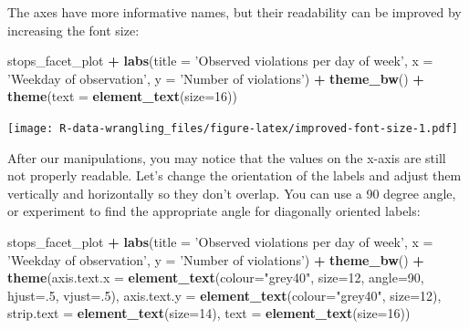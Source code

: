 \documentclass[]{book}
\newenvironment{Shaded}{\begin{snugshade}}{\end{snugshade}}
\newcommand{\DataTypeTok}[1]{\textcolor[rgb]{0.13,0.29,0.53}{#1}}
\newcommand{\DecValTok}[1]{\textcolor[rgb]{0.00,0.00,0.81}{#1}}
\newcommand{\KeywordTok}[1]{\textcolor[rgb]{0.13,0.29,0.53}{\textbf{#1}}}
\newcommand{\NormalTok}[1]{#1}
\newcommand{\OperatorTok}[1]{\textcolor[rgb]{0.81,0.36,0.00}{\textbf{#1}}}
\newcommand{\StringTok}[1]{\textcolor[rgb]{0.31,0.60,0.02}{#1}}
\begin{document}
The axes have more informative names, but their readability can be improved by
increasing the font size:

\begin{Shaded}
\begin{Highlighting}[]
\NormalTok{stops_facet_plot }\OperatorTok{+}
\StringTok{  }\KeywordTok{labs}\NormalTok{(}\DataTypeTok{title =} \StringTok{'Observed violations per day of week'}\NormalTok{,}
         \DataTypeTok{x =} \StringTok{'Weekday of observation'}\NormalTok{,}
         \DataTypeTok{y =} \StringTok{'Number of violations'}\NormalTok{) }\OperatorTok{+}
\StringTok{  }\KeywordTok{theme_bw}\NormalTok{() }\OperatorTok{+}\StringTok{ }
\StringTok{  }\KeywordTok{theme}\NormalTok{(}\DataTypeTok{text =} \KeywordTok{element_text}\NormalTok{(}\DataTypeTok{size=}\DecValTok{16}\NormalTok{))}
\end{Highlighting}
\end{Shaded}

\texttt{[image: R-data-wrangling\_files/figure-latex/improved-font-size-1.pdf]}

After our manipulations, you may notice that the values on the x-axis are still not properly readable. Let's change the orientation of the labels and adjust them vertically and horizontally so they don't overlap. You can use a 90 degree angle, or experiment to find the appropriate angle for diagonally oriented labels:

\begin{Shaded}
\begin{Highlighting}[]
\NormalTok{stops_facet_plot }\OperatorTok{+}
\StringTok{  }\KeywordTok{labs}\NormalTok{(}\DataTypeTok{title =} \StringTok{'Observed violations per day of week'}\NormalTok{,}
         \DataTypeTok{x =} \StringTok{'Weekday of observation'}\NormalTok{,}
         \DataTypeTok{y =} \StringTok{'Number of violations'}\NormalTok{) }\OperatorTok{+}
\StringTok{  }\KeywordTok{theme_bw}\NormalTok{() }\OperatorTok{+}\StringTok{ }
\StringTok{  }\KeywordTok{theme}\NormalTok{(}\DataTypeTok{axis.text.x =} \KeywordTok{element_text}\NormalTok{(}\DataTypeTok{colour=}\StringTok{"grey40"}\NormalTok{, }\DataTypeTok{size=}\DecValTok{12}\NormalTok{, }\DataTypeTok{angle=}\DecValTok{90}\NormalTok{, }\DataTypeTok{hjust=}\NormalTok{.}\DecValTok{5}\NormalTok{, }\DataTypeTok{vjust=}\NormalTok{.}\DecValTok{5}\NormalTok{),}
        \DataTypeTok{axis.text.y =} \KeywordTok{element_text}\NormalTok{(}\DataTypeTok{colour=}\StringTok{"grey40"}\NormalTok{, }\DataTypeTok{size=}\DecValTok{12}\NormalTok{),}
        \DataTypeTok{strip.text =} \KeywordTok{element_text}\NormalTok{(}\DataTypeTok{size=}\DecValTok{14}\NormalTok{),}
        \DataTypeTok{text =} \KeywordTok{element_text}\NormalTok{(}\DataTypeTok{size=}\DecValTok{16}\NormalTok{))}
\end{Highlighting}
\end{Shaded}
\end{document}
